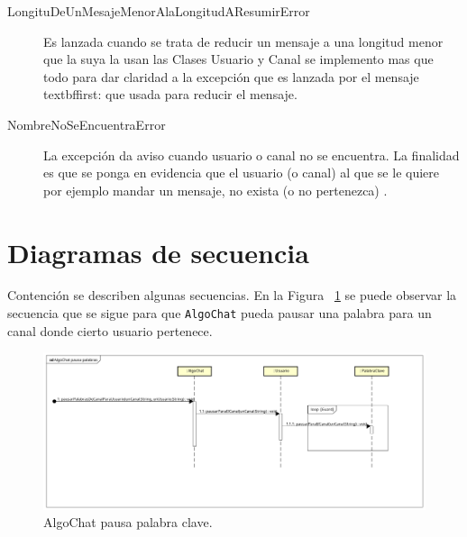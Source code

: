 \documentclass[titlepage,a4paper]{article}
\begin{document}
\begin{description}
\item[LongituDeUnMesajeMenorAlaLongitudAResumirError] Es lanzada cuando se trata de reducir un mensaje a una longitud menor que la suya la usan las Clases Usuario y Canal se implemento mas que todo para dar claridad a la excepción que es lanzada por el mensaje \\textbf{first:} que usada para reducir el mensaje.
\item[NombreNoSeEncuentraError] La excepción da aviso cuando usuario o canal no se encuentra. La finalidad es que se ponga en evidencia que el usuario (o canal) al que se le quiere por ejemplo mandar un mensaje, no exista (o no pertenezca) .
\end{description}

\section{Diagramas de secuencia}\label{sec:diagramasdesecuencia}
Contención se describen algunas secuencias. 
En la Figura ~\ref{fig:seq02} se puede observar la secuencia que se sigue para que \verb|AlgoChat| pueda pausar una palabra para un canal donde cierto usuario pertenece.
\begin{figure}[H]
\centering
\includegraphics[width=\textwidth]{AlgoChat_pausa_palabras.png}
\caption{\label{fig:seq02}AlgoChat pausa palabra clave.}
\end{figure}
\end{document}
